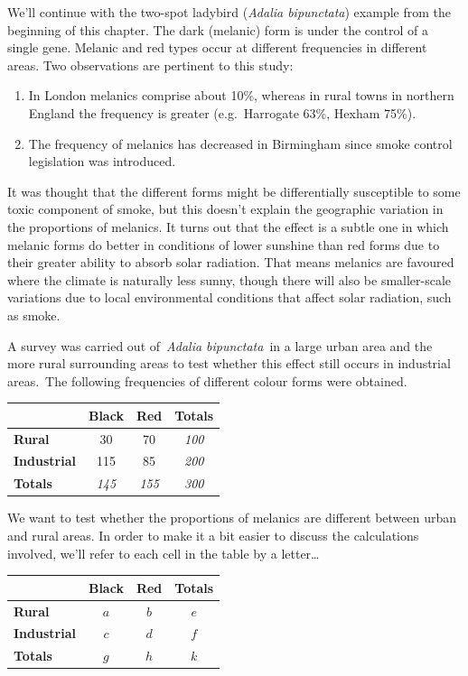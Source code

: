 \documentclass[
]{book}
\providecommand{\tightlist}{%
  \setlength{\itemsep}{0pt}\setlength{\parskip}{0pt}}
\begin{document}
We'll continue with the two-spot ladybird (\emph{Adalia bipunctata}) example from the beginning of this chapter. The dark (melanic) form is under the control of a single gene. Melanic and red types occur at different frequencies in different areas. Two observations are pertinent to this study:

\begin{enumerate}
\def\labelenumi{\arabic{enumi}.}
\tightlist
\item
  In London melanics comprise about 10\%, whereas in rural towns in northern England the frequency is greater (e.g.~Harrogate 63\%, Hexham 75\%).
\item
  The frequency of melanics has decreased in Birmingham since smoke control legislation was introduced.
\end{enumerate}

It was thought that the different forms might be differentially susceptible to some toxic component of smoke, but this doesn't explain the geographic variation in the proportions of melanics. It turns out that the effect is a subtle one in which melanic forms do better in conditions of lower sunshine than red forms due to their greater ability to absorb solar radiation. That means melanics are favoured where the climate is naturally less sunny, though there will also be smaller-scale variations due to local environmental conditions that affect solar radiation, such as smoke.

A survey was carried out of~\emph{Adalia bipunctata}~in a large urban area and the more rural surrounding areas to test whether this effect still occurs in industrial areas.~The following frequencies of different colour forms were obtained.

\begin{longtable}[]{@{}lccc@{}}
\toprule()
& Black & Red & Totals \\
\midrule()
\endhead
\textbf{Rural} & 30 & 70 & \emph{100} \\
\textbf{Industrial} & 115 & 85 & \emph{200} \\
\textbf{Totals} & \emph{145} & \emph{155} & \emph{300} \\
\bottomrule()
\end{longtable}

We want to test whether the proportions of melanics are different between urban and rural areas. In order to make it a bit easier to discuss the calculations involved, we'll refer to each cell in the table by a letter\ldots{}

\begin{longtable}[]{@{}lccc@{}}
\toprule()
& Black & Red & Totals \\
\midrule()
\endhead
\textbf{Rural} & \(a\) & \(b\) & \(e\) \\
\textbf{Industrial} & \(c\) & \(d\) & \(f\) \\
\textbf{Totals} & \(g\) & \(h\) & \(k\) \\
\bottomrule()
\end{longtable}
\end{document}
